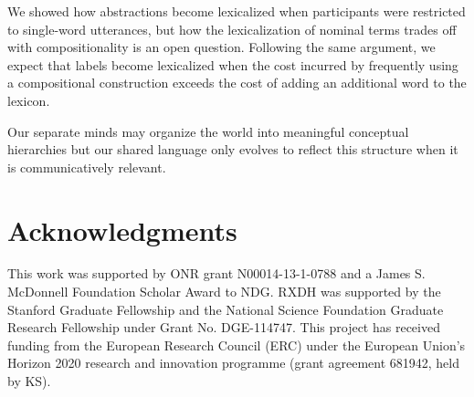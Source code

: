 \documentclass[10pt,letterpaper]{article}
\begin{document}
We showed how abstractions become lexicalized when participants were restricted to single-word utterances, but how the lexicalization of nominal terms trades off with compositionality is an open question. Following the same argument, we expect that labels become lexicalized when the cost incurred by frequently using a compositional construction exceeds the cost of adding an additional word to the lexicon. 

Our separate minds may organize the world into meaningful conceptual hierarchies but our shared language only evolves to reflect this structure when it is communicatively relevant. 


\section{\bf Acknowledgments}
\small
This work was supported by ONR grant N00014-13-1-0788 and a James S. McDonnell Foundation Scholar Award to NDG. RXDH was supported by the Stanford Graduate Fellowship and the National Science Foundation Graduate Research Fellowship under Grant No. DGE-114747. This project has received funding from the European Research Council (ERC) under the European Union's Horizon 2020 research and innovation programme (grant agreement 681942, held by KS).



\setlength{\bibleftmargin}{.125in}
\setlength{\bibindent}{-\bibleftmargin}


\end{document}
